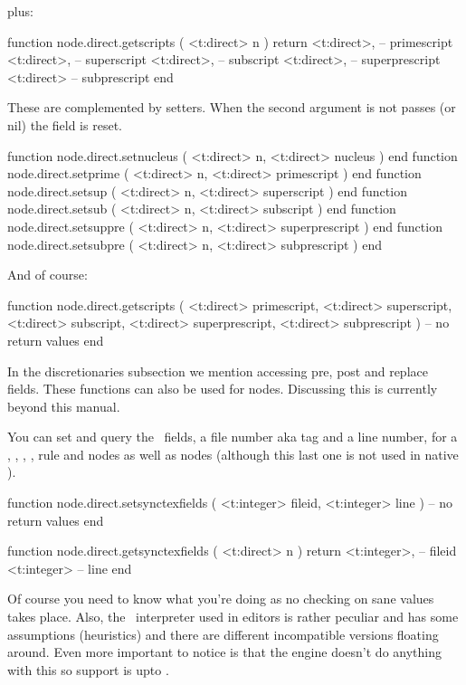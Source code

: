 plus:

\starttyping[option=LUA]
function node.direct.getscripts ( <t:direct> n )
    return
        <t:direct>, -- primescript
        <t:direct>, -- superscript
        <t:direct>, -- subscript
        <t:direct>, -- superprescript
        <t:direct>  -- subprescript
end
\stoptyping

These are complemented by setters. When the second argument is not passes (or nil)
the field is reset.

\starttyping[option=LUA]
function node.direct.setnucleus ( <t:direct> n, <t:direct> nucleus        ) end
function node.direct.setprime   ( <t:direct> n, <t:direct> primescript    ) end
function node.direct.setsup     ( <t:direct> n, <t:direct> superscript    ) end
function node.direct.setsub     ( <t:direct> n, <t:direct> subscript      ) end
function node.direct.setsuppre  ( <t:direct> n, <t:direct> superprescript ) end
function node.direct.setsubpre  ( <t:direct> n, <t:direct> subprescript   ) end
\stoptyping

And of course:

\starttyping[option=LUA]
function node.direct.getscripts (
    <t:direct> primescript,
    <t:direct> superscript,
    <t:direct> subscript,
    <t:direct> superprescript,
    <t:direct> subprescript
)
    -- no return values
end
\stoptyping

In the discretionaries subsection we mention accessing pre, post and replace
fields. These functions can also be used for  nodes. Discussing
this is currently beyond this manual.

\stopsubsection

\startsubsection[title={\SYNCTEX}]

You can set and query the \SYNCTEX\ fields, a file number aka tag and a line
number, for a , , , , \type
{rule} and  nodes as well as  nodes (although this last
one is not used in native \SYNCTEX).

\starttyping[option=LUA]
function node.direct.setsynctexfields ( <t:integer> fileid, <t:integer> line )
    -- no return values
end

function node.direct.getsynctexfields ( <t:direct> n )
    return
        <t:integer>, -- fileid
        <t:integer>  -- line
end
\stoptyping

Of course you need to know what you're doing as no checking on sane values takes
place. Also, the \SYNCTEX\ interpreter used in editors is rather peculiar and has
some assumptions (heuristics) and there are different incompatible versions
floating around. Even more important to notice is that the engine doesn't do
anything with this so support is upto \LUA.


